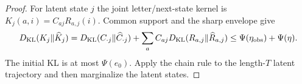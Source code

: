 \begin{proof}
For latent state $j$ the joint letter/next-state kernel is
$K_j(a,i)=C_{aj}R_{a,j}(i)$. Common support and the sharp envelope give
\[
 D_{\rm KL}(K_j\Vert\widehat K_j)
 =D_{\rm KL}(C_{\cdot j}\Vert\widehat C_{\cdot j})
   +\sum_a C_{aj}D_{\rm KL}(R_{a,j}\Vert\widehat R_{a,j})
 \le\Psi(\eta_{\rm obs})+\Psi(\eta).
\]
The initial KL is at most $\Psi(e_0)$. Apply the chain rule to the
length-$T$ latent trajectory and then marginalize the latent states.
\end{proof}
